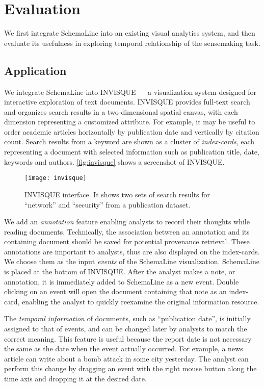 \section{Evaluation}
\label{sub:sl-evaluation}
We first integrate SchemaLine into an existing visual analytics system, and then evaluate its usefulness in exploring temporal relationship of the sensemaking task.

\subsection{Application}
We integrate SchemaLine into INVISQUE~\cite{Wong2011} -- a visualization system designed for interactive exploration of text documents. INVISQUE provides full-text search and organizes search results in a two-dimensional spatial canvas, with each dimension representing a customized attribute. For example, it may be useful to order academic articles horizontally by publication date and vertically by citation count. Search results from a keyword are shown as a cluster of \emph{index-cards}, each representing a document with selected information such as publication title, date, keywords and authors. \autoref{fig:invisque} shows a screenshot of INVISQUE.

\begin{figure}[!htb]
	\centering
	\texttt{[image: invisque]}
	\caption{INVISQUE interface. It shows two sets of search results for ``network'' and ``security'' from a publication dataset.}
	\label{fig:invisque}
\end{figure}

We add an \emph{annotation} feature enabling analysts to record their thoughts while reading documents. Technically, the association between an annotation and its containing document should be saved for potential provenance retrieval. These annotations are important to analysts, thus are also displayed on the index-cards. We choose them as the input \emph{events} of the SchemaLine visualization. SchemaLine is placed at the bottom of INVISQUE. After the analyst makes a note, or annotation, it is immediately added to SchemaLine as a new event. Double clicking on an event will open the document containing that note as an index-card, enabling the analyst to quickly reexamine the original information resource.

The \emph{temporal information} of documents, such as ``publication date'', is initially assigned to that of events, and can be changed later by analysts to match the correct meaning. This feature is useful because the report date is not necessary the same as the date when the event actually occurred. For example, a news article can write about a bomb attack in some city yesterday. The analyst can perform this change by dragging an event with the right mouse button along the time axis and dropping it at the desired date. 

